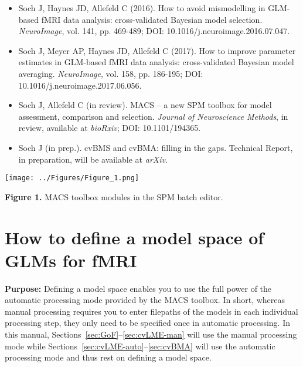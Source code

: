 \documentclass[a4paper,12pt]{article}
\begin{document}
\begin{itemize}

\item
Soch J, Haynes JD, Allefeld C (2016). How to avoid mismodelling in GLM-based fMRI data analysis: cross-validated Bayesian model selection. \textit{NeuroImage}, vol. 141, pp. 469-489; DOI: 10.1016/j.neuroimage.2016.07.047.

\item
Soch J, Meyer AP, Haynes JD, Allefeld C (2017). How to improve parameter estimates in GLM-based fMRI data analysis: cross-validated Bayesian model averaging. \textit{NeuroImage}, vol. 158, pp. 186-195; DOI: 10.1016/j.neuroimage.2017.06.056.

\item
Soch J, Allefeld C (in review). MACS – a new SPM toolbox for model assessment, comparison and selection. \textit{Journal of Neuroscience Methods}, in review, available at \textit{bioRxiv}; DOI: 10.1101/194365.

\item
Soch J (in prep.). cvBMS and cvBMA: filling in the gaps. Technical Report, in preparation, will be available at \textit{arXiv}.

\end{itemize}

\vspace{1em}
\begin{flushleft}
\texttt{[image: ../Figures/Figure\_1.png]}
\end{flushleft}
\vspace{-1em}

\textbf{Figure 1.} MACS toolbox modules in the SPM batch editor.



\pagebreak
\section{How to define a model space of GLMs for fMRI} \label{sec:MS}

\textbf{Purpose:} Defining a model space enables you to use the full power of the automatic processing mode provided by the MACS toolbox. In short, whereas manual processing requires you to enter filepaths of the models in each individual processing step, they only need to be specified once in automatic processing. In this manual, Sections~\ref{sec:GoF}--\ref{sec:cvLME-man} will use the manual processing mode while Sections~\ref{sec:cvLME-auto}--\ref{sec:cvBMA} will use the automatic processing mode and thus rest on defining a model space.
\end{document}
